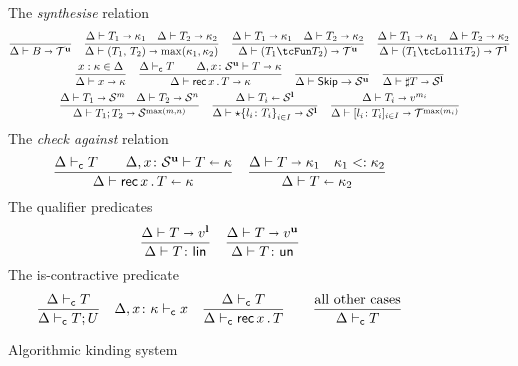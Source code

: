 \begin{figure}[h!]
  The \emph{synthesise} relation \hfill{}
  \begin{gather*}
    \frac{}{\algkindout{\tcBase}{\kindt^\Un}}
    \quad 
    \frac{
      \algkindout{T_1}{\kind_1}
      \quad
      \algkindout{T_2}{\kind_2}
    }{
      \algkindout{\tPair{T_1}{T_2}}{\max(\kind_1, \kind_2)}
    }
    \quad
    \frac{
      \algkindout{T_1}{\kind_1}
      \quad
      \algkindout{T_2}{\kind_2}
    }{
      \algkindout{(\tUnFun{T_1}{T_2})}{\kindt^\Un}
    }
    \quad
    \frac{
      \algkindout{T_1}{\kind_1}
      \quad
      \algkindout{T_2}{\kind_2}
    }{
      \algkindout{(\tLinFun{T_1}{T_2})}{\kindt^\Lin}
    }
    \\
    \frac{x : \kind \in \kindEnv}{\algkindout x \kind}
   \quad
  \frac{
    \contractive T
    \qquad
    \algkindout[\kindEnv, x\colon \kinds^\Un] T \kind
  }{
    \algkindout{\tRec xT}{\kind}
  }
  \quad
  \frac{}{\kindEnv \Alg \tskip \rightarrow \kinds^\Un}
  \quad 
  \frac{}{\algkindout{\tMsg T}{\kinds^\Lin}}
  \\
  \frac{
    \algkindout{T_1}{\kinds^m}
    \quad
    \algkindout{T_2}{\kinds^n}
  }{
    \algkindout{\tSemi{T_1}{T_2}}{\kinds^{\max(m,n)}}
  }
  \quad
  \frac{
    \algkindin{T_i}{\kinds^\Lin}
  }{
    \algkindout{\tChoice{\{l_i\colon T_i\}}_{i\in I}}{\kinds^\Lin}
  }
  \quad
  \frac{
    \algkindout{T_i}{v^{m_i}}
  }{
    \algkindout{\tData{l_i\colon T_i}_{i\in I}}{\kindt^{\max(m_i)}}
  }
  \end{gather*}
  The \emph{check against} relation\hfill{}
  \begin{equation*}
    \frac{
      \contractive T
      \qquad
      \algkindin[\kindEnv, x\colon \kinds^\Un] T \kind
    }{
      \algkindin{\tRec xT}{\kind}
    }
    \quad
    \frac{
      \algkindout{T}{\kind_1}
      \quad
      \subkind{\kind_1}{\kind_2}
    }{
      \algkindin T {\kind_2}
    }
  \end{equation*}
  The qualifier predicates \hfill{}\quad{}
  \begin{equation*}
    \frac{
      \algkindout T {v^\Lin}
    }{
      \isLin T
    }
    \quad
    \frac{
      \algkindout T {v^\Un}
    }{
      \isUn T
    }
  \end{equation*}
  The is-contractive predicate \hfill{}
  \begin{equation*}
    \frac{
      \contractive{T}
    }{
      \contractive{T;U}
    }
    \quad
    \contractive[\kindEnv,x\colon\kind]{x}
    \quad 
    \frac{
      \contractive{T}
    }{
      \contractive{\tRecK xT}
    }
    \qquad
    \frac{\text{all other cases}}{\contractive{T}}
  \end{equation*}
  \caption{Algorithmic kinding system}
  \label{fig:kinding-system}
\end{figure}

